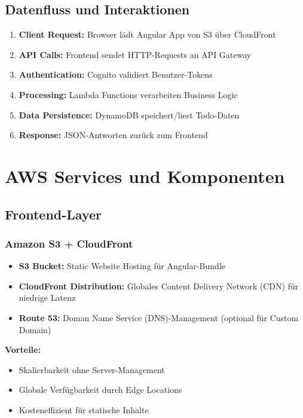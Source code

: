 \subsection{Datenfluss und Interaktionen}
\begin{enumerate}
    \item \textbf{Client Request:} Browser lädt Angular App von S3 über CloudFront
    \item \textbf{API Calls:} Frontend sendet HTTP-Requests an API Gateway
    \item \textbf{Authentication:} Cognito validiert Benutzer-Tokens
    \item \textbf{Processing:} Lambda Functions verarbeiten Business Logic
    \item \textbf{Data Persistence:} DynamoDB speichert/liest Todo-Daten
    \item \textbf{Response:} JSON-Antworten zurück zum Frontend
\end{enumerate}


\section{AWS Services und Komponenten}

\subsection{Frontend-Layer}

\subsubsection{Amazon S3 + CloudFront}

\begin{itemize}
    \item \textbf{S3 Bucket:} Static Website Hosting für Angular-Bundle \cite{infosys2025s3hosting}
    \item \textbf{CloudFront Distribution:} Globales Content Delivery Network (CDN) für niedrige Latenz
    \item \textbf{Route 53:} Doman Name Service (DNS)-Management (optional für Custom Domain)
\end{itemize}

\textbf{Vorteile:}
\begin{itemize}
    \item Skalierbarkeit ohne Server-Management
    \item Globale Verfügbarkeit durch Edge Locations \cite{xu2024understanding}
    \item Kosteneffizient für statische Inhalte
\end{itemize}

